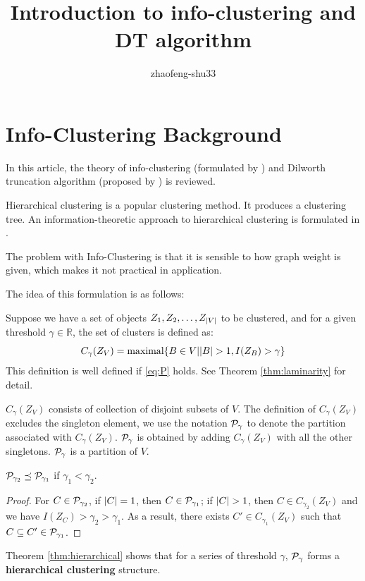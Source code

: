 \documentclass{article}
\begin{document}
\title{Introduction to info-clustering and DT algorithm}
\author{zhaofeng-shu33}
\maketitle
\tableofcontents
\section{Info-Clustering Background}
In this article, the theory of info-clustering (formulated by \cite{ic}) and Dilworth truncation algorithm (proposed by \cite{psp}) is reviewed.

Hierarchical clustering is a popular clustering method. It produces a clustering tree. 
An information-theoretic approach to hierarchical clustering is formulated in \cite{ic}.

The problem with Info-Clustering is that it is sensible to how graph weight is given, which makes it not practical in application.

The idea of this formulation is as follows:

Suppose we have a set of objects $Z_1, Z_2, \dots, Z_{\abs{V}}$ to be clustered, and for a given threshold $\gamma \in \mathbb{R}$, the set of clusters is defined as:
\begin{equation}\label{eq:def_CgammaZV}
C_{\gamma}(Z_V) = \textrm{maximal}\{ B \in V \vert \abs{B} > 1, I(Z_B) > \gamma \}
\end{equation}
This definition is well defined if \eqref{eq:P} holds. See Theorem \ref{thm:laminarity} for detail.

$C_{\gamma}(Z_V)$ consists of collection of disjoint subsets of $V$.
The definition of $C_{\gamma}(Z_V)$ excludes the singleton element,
we use the notation $\P_{\gamma}$ to denote the partition associated with $C_{\gamma}(Z_V)$. $\P_{\gamma}$ is obtained by adding $C_{\gamma}(Z_V)$ with all the other singletons.
$\P_{\gamma}$ is a partition of $V$.

\begin{theorem}\label{thm:hierarchical}
$\P_{\gamma_2} \preceq \P_{\gamma_1}$ if $\gamma_1 < \gamma_2$.
\end{theorem}
\begin{proof}
For $C \in \P_{\gamma_2}$, if $\abs{C}=1$, then  $C\in \P_{\gamma_1}$;
if $\abs{C}>1$, then $C \in C_{\gamma_2}(Z_V)$ and we have $I(Z_C) > \gamma_2 > \gamma_1$.
As a result, there exists $C' \in C_{\gamma_1}(Z_V)$ such that $C\subseteq C' \in \P_{\gamma_1}$.
\end{proof}
\begin{remark}
Theorem \ref{thm:hierarchical} shows that for a series of threshold $\gamma$, $\P_{\gamma}$ forms a \textbf{hierarchical clustering} structure.
\end{remark}
\end{document}

